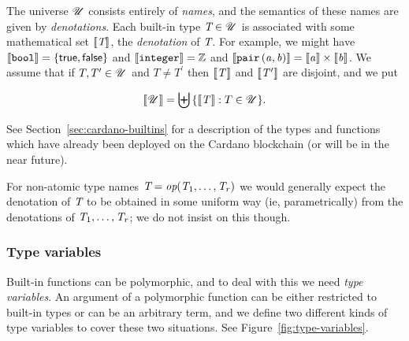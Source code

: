 

The universe $\mathscr{U}$ consists entirely of \textit{names}, and the semantics of
these names are given by \textit{denotations}. Each built-in type $\textit{T} \in \mathscr{U}$
is associated with some mathematical set $\llbracket\mathit{\textit{T}}\rrbracket$, the \textit{denotation}
of $\textit{T}$. For example, we might have $\llbracket\mathit{\texttt{bool}}\rrbracket= \{\mathsf{true},
\mathsf{false}\}$ and $\llbracket\mathit{\texttt{integer}}\rrbracket = \mathbb{Z}$ and
$\llbracket\mathit{\mathtt{pair}\,\mathtt{(}a\mathtt{,}\,b\mathtt{)}}\rrbracket = \llbracket\mathit{a}\rrbracket \times \llbracket\mathit{b}\rrbracket$.  We assume that if $T,
T^{\prime} \in \mathscr{U}$ and $T \ne T^{\prime}$ then $\llbracket\mathit{T}\rrbracket$ and
$\llbracket\mathit{T^{\prime}}\rrbracket$ are disjoint, and we put

$$\llbracket\mathit{\mathscr{U}}\rrbracket = \biguplus{\{\llbracket\mathit{T}\rrbracket: T \in \mathscr{U}\}}.$$%

\noindent See Section~\ref{sec:cardano-builtins}
for a description of the types and functions which have already been deployed on
the Cardano blockchain (or will be in the near future).

For non-atomic type names $\textit{T} = \textit{op}(\textit{T}_1, \ldots, \textit{T}_r)$ we would generally
expect the denotation of $\textit{T}$ to be obtained in some uniform way (ie,
parametrically) from the denotations of $\textit{T}_1, \ldots, \textit{T}_r$; we do not insist
on this though.

\newcommand{\tv}{\ensuremath{\textit{tv}}}

\subsubsection{Type variables}
\label{sec:type-variables}
Built-in functions can be polymorphic, and to deal with this we need
\textit{type variables}.  An argument of a polymorphic function can be either
restricted to built-in types or can be an arbitrary term, and we define two
different kinds of type variables to cover these two situations.  See
Figure~\ref{fig:type-variables}.

